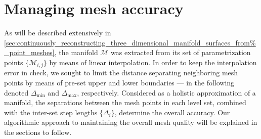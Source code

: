 \section{Managing mesh accuracy}
\label{sec:managing_mesh_accuracy}

As will be described extensively in
\cref{sec:continuously_reconstructing_three_dimensional_manifold_surfaces_from%
_point_meshes},
the manifold $\mathcal{M}$ was extracted from its set of parametrization
points $\{\mathcal{M}_{i,j}\}$ by means of linear interpolation. In order to
keep the interpolation error in check, we sought to limit the distance
separating neighboring mesh points by means of pre-set upper and lower
boundaries --- in the following denoted $\Delta_{\min}$ and $\Delta_{\max}$,
respectively. Considered as a holistic approximation of a manifold, the
separations between the mesh points in each level set, combined with the
inter-set step lengths $\{\Delta_{i}\}$, determine the overall accuracy. Our
algorithmic approach to maintaining the overall mesh quality will be explained
in the sections to follow.






